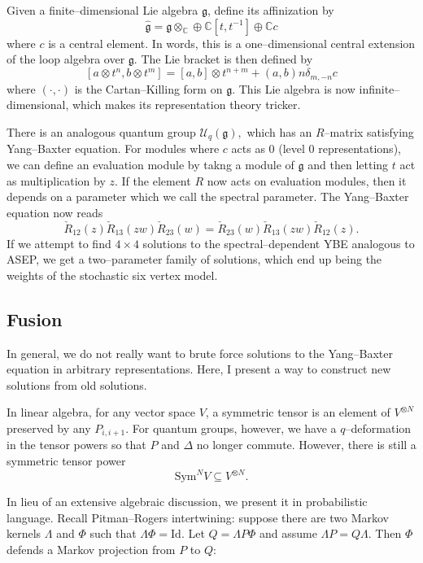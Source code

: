 \documentclass{ximera}
\begin{document}
Given a finite--dimensional Lie algebra $\mathfrak{g}$, define its affinization by
$$
\hat{\mathfrak{g}} = \mathfrak{g} \otimes_{\mathbb{C}} \oplus \mathbb{C}[t,t^{-1}] \oplus \mathbb{C}c
$$
where $c$ is a central element. In words, this is a one--dimensional central extension of the loop algebra
over $\mathfrak{g}.$ The Lie bracket is then defined by 
$$
[a\otimes t^n, b\otimes t^m] = [a,b] \otimes t^{n+m} + (a,b)n\delta_{m,-n}c
$$
where $(\cdot,\cdot)$ is the Cartan--Killing form on $\mathfrak{g}.$ This Lie algebra is now
infinite--dimensional, which makes its representation theory tricker. 

There is an analogous quantum group $\mathcal{U}_q(\mathfrak{g}),$ which has an $R$--matrix satisfying
Yang--Baxter equation. For modules where $c$ acts as $0$ (level $0$ representations), we can define an
evaluation module by takng a module of $\mathfrak{g}$ and then letting $t$ act as multiplication by $z$. 
If the element $R$ now acts on evaluation modules, then it depends on a parameter which we call the 
spectral parameter. The Yang--Baxter equation now reads
$$
\check{R}_{12}(z) \check{R}_{13}(zw) \check{R}_{23}(w) = \check{R}_{23}(w) \check{R}_{13}(zw) \check{R}_{12}(z).
$$
If we attempt to find $4\times 4$ solutions to the spectral--dependent YBE analogous to ASEP, we get
a two--parameter family of solutions, which end up being the weights of the stochastic six vertex model.

\subsection{Fusion}
In general, we do not really want to brute force solutions to the Yang--Baxter equation in arbitrary
representations. Here, I present a way to construct new solutions from old solutions. 

In linear algebra, for any vector space $V$, a symmetric tensor is an element of $V^{\otimes N}$ 
preserved by any $P_{i,i+1}.$ For quantum groups, however, we have a $q$--deformation in the tensor powers
so that $P$ and $\Delta$ no longer commute. However, there is still a symmetric tensor power
$$
\mathrm{Sym}^N V \subseteq V^{\otimes N}.
$$

In lieu of an extensive algebraic discussion, we present it in probabilistic language. Recall
Pitman--Rogers intertwining: suppose there are 
two Markov kernels $\Lambda$ and $\Phi$ such that $\Lambda\Phi=\mathrm{Id}$. Let $Q=\Lambda P\Phi$ and 
assume $\Lambda P = Q\Lambda.$ Then $\Phi$ defends a Markov projection from $P$ to $Q$:
\end{document}
